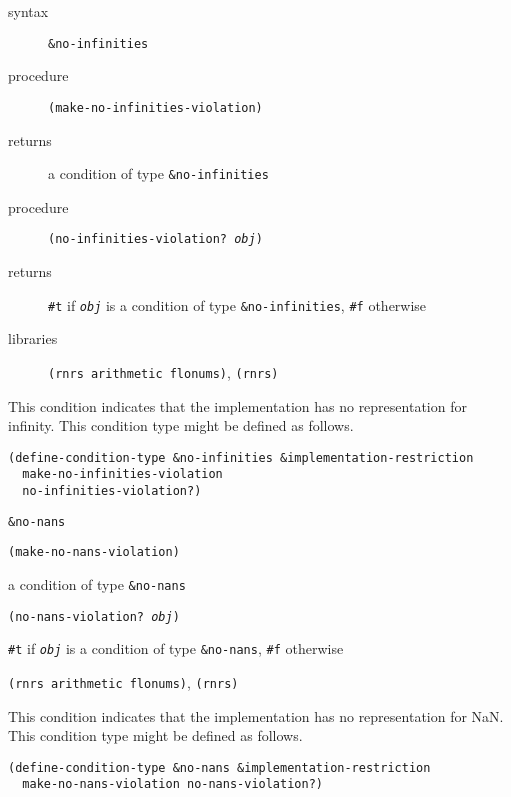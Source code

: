 \begin{description}

\label{exceptions_s44}\item[syntax] \texttt{\&{}no-infinities}



\item[procedure] \texttt{(make-no-infinities-violation)}



\item[returns] a condition of type \texttt{\&{}no-infinities}


\item[procedure] \texttt{(no-infinities-violation? \textit{obj})}



\item[returns] \texttt{\#{}t} if \texttt{\textit{obj}} is a condition of type \texttt{\&{}no-infinities}, \texttt{\#{}f} otherwise


\item[libraries] \texttt{(rnrs arithmetic flonums)}, \texttt{(rnrs)}
\end{description}



This condition indicates that the implementation has no representation for
infinity.
This condition type might be defined as follows.

\begin{alltt}
(define-condition-type \&{}no-infinities \&{}implementation-restriction
  make-no-infinities-violation
  no-infinities-violation?)
\end{alltt}

\begin{description}

\label{exceptions_s45}\item[syntax] \texttt{\&{}no-nans}



\item[procedure] \texttt{(make-no-nans-violation)}



\item[returns] a condition of type \texttt{\&{}no-nans}


\item[procedure] \texttt{(no-nans-violation? \textit{obj})}



\item[returns] \texttt{\#{}t} if \texttt{\textit{obj}} is a condition of type \texttt{\&{}no-nans}, \texttt{\#{}f} otherwise


\item[libraries] \texttt{(rnrs arithmetic flonums)}, \texttt{(rnrs)}
\end{description}



This condition indicates that the implementation has no representation for
NaN.
This condition type might be defined as follows.

\begin{alltt}
(define-condition-type \&{}no-nans \&{}implementation-restriction
  make-no-nans-violation no-nans-violation?)
\end{alltt}



